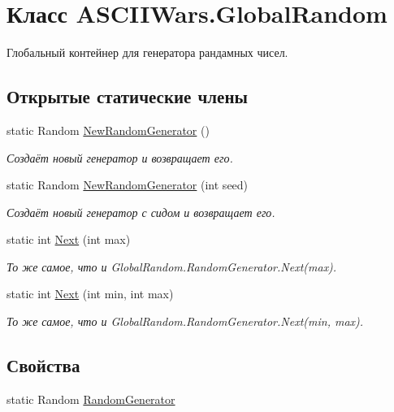 \hypertarget{class_a_s_c_i_i_wars_1_1_global_random}{}\section{Класс A\+S\+C\+I\+I\+Wars.\+Global\+Random}
\label{class_a_s_c_i_i_wars_1_1_global_random}


Глобальный контейнер для генератора рандамных чисел.  


\subsection*{Открытые статические члены}
\begin{DoxyCompactItemize}
\item 
static Random \hyperlink{class_a_s_c_i_i_wars_1_1_global_random_ad40c313d502809aad3398da0e8d1d8e6}{New\+Random\+Generator} ()
\begin{DoxyCompactList}\small\item\em Создаёт новый генератор и возвращает его. \end{DoxyCompactList}\item 
static Random \hyperlink{class_a_s_c_i_i_wars_1_1_global_random_a781ebf6e30b09d6b5ec1f97a2337564b}{New\+Random\+Generator} (int seed)
\begin{DoxyCompactList}\small\item\em Создаёт новый генератор с сидом и возвращает его. \end{DoxyCompactList}\item 
static int \hyperlink{class_a_s_c_i_i_wars_1_1_global_random_a64f8803c3b01fc0971feac020deaa8c6}{Next} (int max)
\begin{DoxyCompactList}\small\item\em То же самое, что и {\ttfamily Global\+Random.\+Random\+Generator.\+Next(max)}. \end{DoxyCompactList}\item 
static int \hyperlink{class_a_s_c_i_i_wars_1_1_global_random_af84b17383838baa18d8c1d070d26e6c5}{Next} (int min, int max)
\begin{DoxyCompactList}\small\item\em То же самое, что и {\ttfamily Global\+Random.\+Random\+Generator.\+Next(min, max)}. \end{DoxyCompactList}\end{DoxyCompactItemize}
\subsection*{Свойства}
\begin{DoxyCompactItemize}
\item 
static Random \hyperlink{class_a_s_c_i_i_wars_1_1_global_random_a9d81774ce986f79fb427fd575463d63b}{Random\+Generator}
\end{DoxyCompactItemize}
